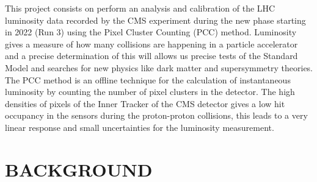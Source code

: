 \documentclass[final,12pt]{article}
\begin{document}
  \vspace{1 cm}
 
  
  This  project consists on  perform an analysis and calibration of the LHC luminosity data recorded
  by the CMS experiment during the new phase starting in 2022 (Run 3) using the Pixel Cluster Counting (PCC) method.
Luminosity gives a measure of how many collisions are happening in a particle accelerator  and a precise determination of this will allows us precise tests of the Standard Model and searches for new physics like dark matter and supersymmetry theories.
The PCC method is an offline technique for the calculation of instantaneous luminosity  by counting the number of pixel clusters in the detector.
The high densities of pixels of the Inner Tracker of the CMS detector gives a low hit occupancy in the sensors during the proton-proton collisions, this leads to a very linear response and small  uncertainties for the luminosity measurement.   
  \hspace{2pt}
\vfill



\newpage
\section{BACKGROUND}
\end{document}
